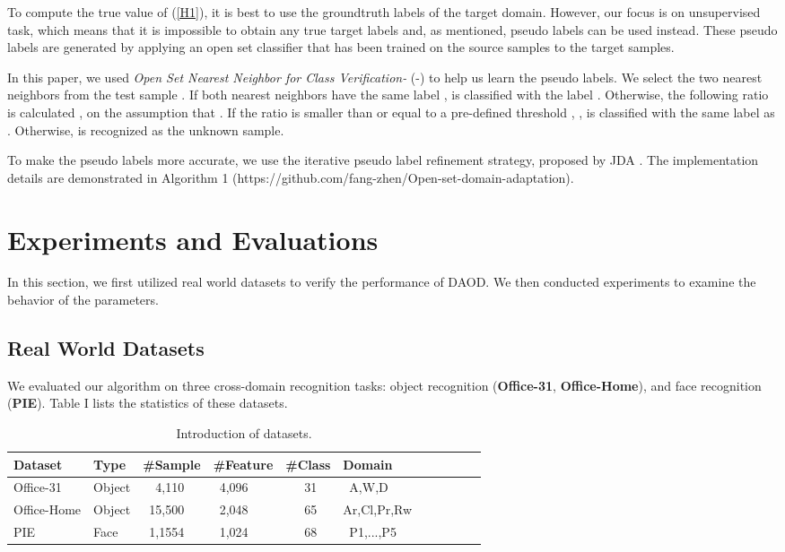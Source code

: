\documentclass[journal]{IEEEtran}
\begin{document}
To compute the true value of (\ref{H1}), it is best to use the groundtruth labels of the target domain.  However, our focus is on unsupervised task, which means that it is impossible to obtain any true target labels and, as mentioned, pseudo labels can be used instead. These pseudo labels are generated by applying an open set classifier that has been trained on the source samples to the target samples.
 
 In this paper, we used \textit{Open Set Nearest Neighbor for Class Verification-} (-) \cite{DBLP:journals/ml/Mendes-JuniorSW17}  to help us learn the pseudo labels. We select the two nearest neighbors  from the test sample . 
If both nearest neighbors have the
same label ,  is classified with the label . Otherwise, the following ratio is calculated
 ,
on the assumption that . If the ratio is smaller than or equal to a pre-defined threshold , ,  is classified with the same label as . Otherwise,  is recognized as the unknown sample.
 
To make the pseudo labels more accurate, we use the iterative pseudo label refinement strategy, proposed by JDA \cite{long2013transfer}. The implementation details are demonstrated in Algorithm 1 (https://github.com/fang-zhen/Open-set-domain-adaptation).
 






 
  
 




\section{Experiments and Evaluations}
In this section, we first utilized real world datasets to verify
the performance of DAOD. We then conducted experiments to examine the behavior of the parameters. 

\subsection{Real World Datasets}
We evaluated our algorithm on three cross-domain  recognition tasks: object recognition (\textbf{Office-31}, \textbf{Office-Home}), and face recognition (\textbf{PIE}). Table I lists the statistics of these datasets.
\begin{table}[h]
\scriptsize
\caption{{Introduction of datasets.}}
\begin{center}
\begin{tabular}{p{1.3cm}lp{1cm}lp{1cm} lp{1cm}lp{1cm}lp{1cm}}
\hline \hline
Dataset  &Type&\#Sample& \#Feature&\#Class & Domain   \\ \hline
Office-31  &Object&~~4,110&~4,096&~~~31&~A,W,D \\ 
Office-Home  &Object&~15,500&~2,048&~~~65&Ar,Cl,Pr,Rw\\ 
PIE   &Face&~1,1554&~1,024&~~~68&~P1,...,P5\\
\hline
\hline
\end{tabular}
\end{center}
\end{table}
\end{document}
